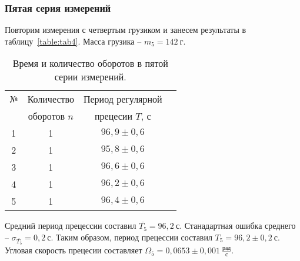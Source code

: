 \documentclass[a4paper,11pt]{article}
\begin{document}
\subsubsection{Пятая серия измерений} %
Повторим измерения с четвертым грузиком и занесем результаты в таблицу~\ref{table:tab4}.\newline
Масса грузика -- $m_{5} = 142\ г$.
\begin{table}[h!]
\centering
\begin{tabular}{ ||c|c|c|c|| }
  \hline
  № & Количество & Период регулярной \\
   & оборотов $n$  & прецесии $T$, $с$ \\
  \hline
  1 & 1 & $96,9 \pm 0,6$ \\
  2 & 1 & $95,8 \pm 0,6$ \\
  3 & 1 & $96,6 \pm 0,6$ \\
  4 & 1 & $96,2 \pm 0,6$ \\
  5 & 1 & $96,4 \pm 0,6$ \\
  \hline
\end{tabular}
\caption{Время и количество оборотов в пятой серии измерений.}
\label{table:tab5}
\end{table}\newline
Средний период прецессии составил $\overline{T_{5}} = 96,2\ с$.\newline
Станадартная ошибка среднего -- $\sigma_{\overline{T_{5}}}= 0,2\ с$.\newline
Таким образом, период прецессии составил $T_{5} = 96,2 \pm 0,2\ с$.\newline
Угловая скорость прецесии составляет $\Omega_{5} = 0,0653 \pm 0,001\ \frac{рад}{с}$.
\end{document}
